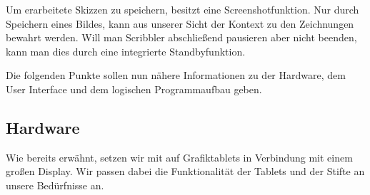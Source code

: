 \medskip Um erarbeitete Skizzen zu speichern, besitzt \scribbler eine Screenshotfunktion. Nur durch Speichern eines Bildes, kann aus unserer Sicht der Kontext zu den Zeichnungen bewahrt werden. Will man Scribbler abschließend pausieren aber nicht beenden, kann man dies durch eine integrierte Standbyfunktion.

\medskip Die folgenden Punkte sollen nun nähere Informationen zu der Hardware, dem User Interface und dem logischen Programmaufbau geben. 

\subsection{Hardware}
Wie bereits erwähnt, setzen wir mit \scribbler auf Grafiktablets in Verbindung mit einem großen Display. Wir passen dabei die Funktionalität der Tablets und der Stifte an unsere Bedürfnisse an. 

